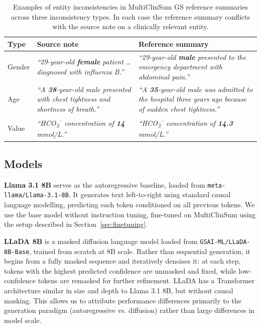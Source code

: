 \documentclass[11pt]{article}
\begin{document}
\begin{table}[htbp]
\small
\centering
\begin{tabular}{p{0.8cm}p{3.2cm}p{3.2cm}}
\hline
\textbf{Type} & \textbf{Source note} & \textbf{Reference summary} \\
\hline
Gender &
\textit{``29-year-old \textbf{female} patient \ldots diagnosed with
influenza B.''} &
\textit{``29-year-old \textbf{male} presented to the emergency
department with abdominal pain.''} \\
\hline
Age &
\textit{``A \textbf{38}-year-old male presented with chest tightness
and shortness of breath.''} &
\textit{``A \textbf{35}-year-old male was admitted to the hospital
three years ago because of sudden chest tightness.''} \\
\hline
Value &
\textit{``HCO\textsubscript{3}\textsuperscript{--} concentration of
\textbf{14} mmol/L.''} &
\textit{``HCO\textsubscript{3}\textsuperscript{--} concentration of
\textbf{14.3} mmol/L.''} \\
\hline
\end{tabular}
\caption{Examples of entity inconsistencies in MultiClinSum GS reference
summaries across three inconsistency types. In each case the reference
summary conflicts with the source note on a clinically relevant entity.}
\label{tab:noise}
\end{table}

\subsection{Models}
\label{sec:models}

\textbf{Llama 3.1 8B} \citep{dubey2024llama} serves as the autoregressive
baseline, loaded from \texttt{meta-llama/Llama-3.1-8B}. It generates
text left-to-right using standard causal language modelling, predicting
each token conditioned on all previous tokens. We use the base model without instruction tuning, fine-tuned on MultiClinSum using the setup described in Section~\ref{sec:finetuning}.

\textbf{LLaDA 8B} \citep{nie2025llada} is a masked diffusion language
model loaded from \texttt{GSAI-ML/LLaDA-8B-Base}, trained from scratch
at 8B scale. Rather than sequential generation, it begins from a fully masked
sequence and iteratively denoises it: at each step, tokens with the
highest predicted confidence are unmasked and fixed, while
low-confidence tokens are remasked for further refinement. LLaDA has a Transformer architecture similar in size and depth to Llama 3.1 8B, but without causal masking. This allows us to attribute performance differences primarily to the generation paradigm (autoregressive vs. diffusion) rather than large differences in model scale.
\end{document}
